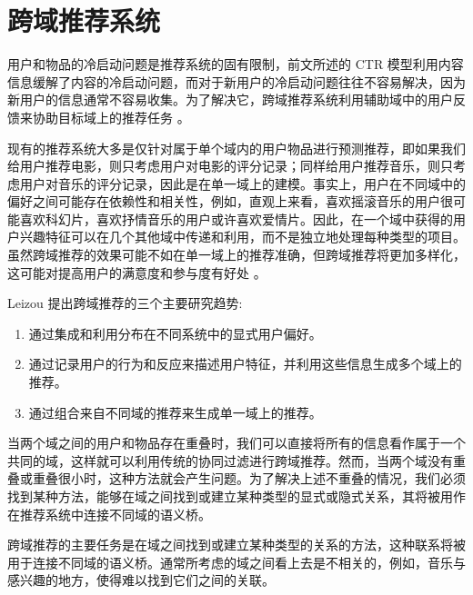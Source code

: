 


\section{跨域推荐系统} %
\label{sec:跨域推荐系统}
用户和物品的冷启动问题是推荐系统的固有限制，前文所述的 CTR 模型利用内容信息缓解了内容的冷启动问题，而对于新用户的冷启动问题往往不容易解决，因为新用户的信息通常不容易收集。为了解决它，跨域推荐系统利用辅助域中的用户反馈来协助目标域上的推荐任务 \cite{Xin2015Cross}。

现有的推荐系统大多是仅针对属于单个域内的用户物品进行预测推荐，即如果我们给用户推荐电影，则只考虑用户对电影的评分记录；同样给用户推荐音乐，则只考虑用户对音乐的评分记录，因此是在单一域上的建模。事实上，用户在不同域中的偏好之间可能存在依赖性和相关性，例如，直观上来看，喜欢摇滚音乐的用户很可能喜欢科幻片，喜欢抒情音乐的用户或许喜欢爱情片。因此，在一个域中获得的用户兴趣特征可以在几个其他域中传递和利用，而不是独立地处理每种类型的项目。虽然跨域推荐的效果可能不如在单一域上的推荐准确，但跨域推荐将更加多样化，这可能对提高用户的满意度和参与度有好处 \cite{Fern2012Cross}。

Leizou \cite{Loizou2009How} 提出跨域推荐的三个主要研究趋势:
\begin{enumerate}[itemindent=1em]
\item 通过集成和利用分布在不同系统中的显式用户偏好。
\item 通过记录用户的行为和反应来描述用户特征，并利用这些信息生成多个域上的推荐。
\item 通过组合来自不同域的推荐来生成单一域上的推荐。
\end{enumerate}

当两个域之间的用户和物品存在重叠时，我们可以直接将所有的信息看作属于一个共同的域，这样就可以利用传统的协同过滤进行跨域推荐。然而，当两个域没有重叠或重叠很小时，这种方法就会产生问题。为了解决上述不重叠的情况，我们必须找到某种方法，能够在域之间找到或建立某种类型的显式或隐式关系，其将被用作在推荐系统中连接不同域的语义桥\cite{Fern2012Cross}。

跨域推荐的主要任务是在域之间找到或建立某种类型的关系的方法，这种联系将被用于连接不同域的语义桥。通常所考虑的域之间看上去是不相关的，例如，音乐与感兴趣的地方，使得难以找到它们之间的关联。

